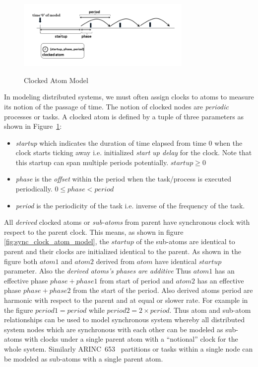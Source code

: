 \begin{figure}[h!]
\centering
\caption{Clocked Atom Model}
 \includegraphics[width=0.75\textwidth]{figures/clocked_atom.png} 
\label{fig:clock_atom_model}
\end{figure}

In modeling distributed systems, we must often assign clocks to atoms to measure its notion of the passage of time. The notion of clocked nodes are \emph{periodic} processes or tasks.  A clocked atom is defined by a tuple of three parameters as shown in Figure~\ref{fig:clock_atom_model}:
\begin{itemize}
\item {\it startup} which indicates the duration of time elapsed from time $0$ when the clock starts ticking away i.e. initialized \emph{start up delay} for the clock. Note that this startup can span multiple periods potentially. $startup \geq 0$
\item {\it phase} is the \emph{offset} within the period when the task/process is executed periodically. $0 \leq phase < period$
\item {\it period} is the periodicity of the task i.e. inverse of the frequency of the task.
\end{itemize}

All \emph{derived} clocked atoms or \emph{sub-atoms} from parent have synchronous clock with respect to the parent clock. This means, as shown in figure \ref{fig:sync_clock_atom_model}, the $startup$ of the sub-atoms are identical to parent and their clocks are initialized identical to the parent. As shown in the figure both $atom1$ and $atom2$ derived from $atom$ have identical $startup$ parameter. Also the \emph{derived atoms's phases are additive} Thus $atom1$ has an effective phase $phase+phase1$ from start of period and $atom2$ has an effective phase $phase+phase2$ from the start of the period. Also derived atoms period are harmonic with respect to the parent and at equal or slower rate. For example in the figure $period1 = period$ while $period2 = 2 \times period$. Thus atom and sub-atom relationships can be used to model synchronous system whereby all distributed system nodes which are synchronous with each other can be modeled as sub-atoms with clocks under a single parent atom with a ``notional'' clock for the whole system. Similarly ARINC~653~\cite{arinc653} partitions or tasks within a single node can be modeled as sub-atoms with a single parent atom.


